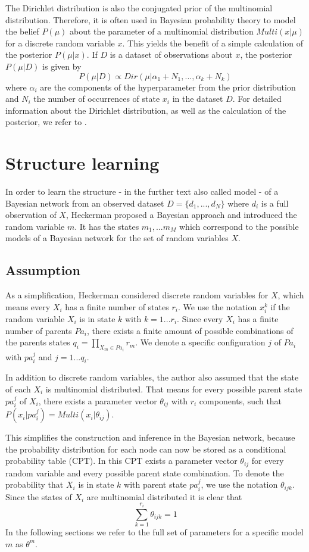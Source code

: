 \documentclass{article}
\begin{document}
	The Dirichlet distribution is also the conjugated prior of the multinomial distribution.
	Therefore, it is often used in Bayesian probability theory to model the belief $P(\mu)$ about the
	parameter of a multinomial distribution $Multi(x|\mu)$ for a discrete random variable $x$.
	This yields the benefit of a simple calculation of the posterior $P(\mu|x)$.
	If $D$ is a dataset of observations about $x$, the posterior $P(\mu|D)$
	is given by
	\[
		P(\mu|D) \propto Dir(\mu|\alpha_1+N_1, ..., \alpha_k+N_k)
	\]	
	where $\alpha_i$ are the components of the hyperparameter from the prior distribution
	and $N_i$ the number of occurrences of state $x_i$ in the dataset $D$.
	For detailed information about the Dirichlet distribution, as well as the calculation of the
	posterior, we refer to \cite{hcg}.

\section{Structure learning}
\label{sec:structure_learning}
	In order to learn the structure - in the further text also called model - of a Bayesian network 
	from an observed dataset $D=\{d_1,...,d_N\}$ where $d_i$ is a full observation of $X$,
	Heckerman 	proposed a Bayesian approach 
	and introduced the random variable $m$. It has the states $m_1,...m_M$ which correspond to the 
	possible models of a Bayesian network for the set of random variables $X$.
	
	\subsection{Assumption}
	As a simplification, Heckerman considered discrete random variables for $X$, which means	every $X_i$ has a
	finite number of	states $r_i$. We use the notation $x_i^k$ if the random variable $X_i$ is in state $k$
	with $k = 1...r_i$. Since every $X_i$ has a finite number of parents $Pa_i$, there exists
	a finite amount of possible combinations of the parents states $q_i=\prod_{X_m \in Pa_i} r_m$.
	We denote a specific configuration $j$ of $Pa_i$ with $pa_i^j$ and $j=1...q_i$. 
	
	In addition	to discrete random variables, the author also assumed that the state of each $X_i$
	is multinomial distributed. That means for every possible parent state $pa_i^j$ of $X_i$, there
	exists a parameter vector $\theta_{ij}$ with $r_i$ components,
	such that $P(x_i|pa_i^j)=Multi(x_i|\theta_{ij})$.
	
	This simplifies the construction and inference in the Bayesian network,	because the probability
  distribution for each node can now be stored as a conditional probability table (CPT). In this CPT
	exists a parameter vector $\theta_{ij}$ for every random variable and every possible parent state
	combination. To denote the probability that $X_i$ is in state $k$ with parent state $pa_i^j$, we
	use the notation $\theta_{ijk}$. Since the states of $X_i$ are multinomial distributed it is clear
	that
	\[
		\sum_{k=1}^{r_i} \theta_{ijk} = 1
	\]
	In the following sections we refer to the full set of parameters for a specific model $m$
	as $\theta^m$.	
	
\end{document}
